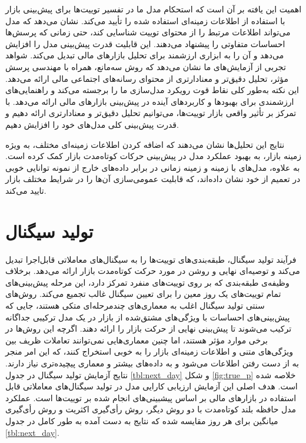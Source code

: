 اهمیت این یافته بر آن است که استحکام مدل ما در تفسیر توییت‌ها برای پیش‌بینی بازار با استفاده‌ از اطلاعات زمینه‌ای استفاده شده را تأیید می‌کند. نشان می‌دهد که مدل می‌تواند اطلاعات مرتبط را از محتوای توییت شناسایی کند، حتی زمانی که پرسش‌ها احساسات متفاوتی را پیشنهاد می‌دهند. این قابلیت قدرت پیش‌بینی مدل را افزایش می‌دهد و آن را به ابزاری ارزشمند برای تحلیل بازارهای مالی تبدیل می‌کند. شواهد تجربی از آزمایش‌های ما نشان می‌دهد که روش سه‌مانع، همراه با مهندسی پرسش مؤثر، تحلیل دقیق‌تر و معنادارتری از محتوای رسانه‌های اجتماعی مالی ارائه می‌دهد. این نکته به‌طور کلی نقاط قوت رویکرد مدل‌سازی ما را برجسته می‌کند و راهنمایی‌های ارزشمندی برای بهبودها و کاربردهای آینده در پیش‌بینی بازارهای مالی ارائه می‌دهد. با تمرکز بر تأثیر واقعی بازار توییت‌ها، می‌توانیم تحلیل دقیق‌تر و معنادارتری ارائه دهیم و قدرت پیش‌بینی کلی مدل‌های خود را افزایش دهیم.

نتایج این تحلیل‌ها نشان می‌دهند که اضافه کردن اطلاعات زمینه‌‌ای مختلف، به ویژه زمینه بازار، به بهبود عملکرد مدل در پیش‌بینی حرکات کوتاه‌مدت بازار کمک کرده است. به علاوه، مدل‌های با زمینه و زمینه زمانی در برابر داده‌های خارج از نمونه توانایی خوبی در تعمیم از خود نشان داده‌اند، که قابلیت عمومی‌سازی آن‌ها را در شرایط مختلف بازار تایید می‌کند.


\newpage
\section{تولید سیگنال}
فرآیند تولید سیگنال، طبقه‌بندی‌های توییت‌ها را به سیگنال‌های معاملاتی قابل‌اجرا تبدیل می‌کند و توصیه‌ای نهایی و روشن در مورد حرکت کوتاه‌مدت بازار ارائه می‌دهد. برخلاف وظیفه‌ی طبقه‌بندی که بر روی توییت‌های منفرد تمرکز دارد، این مرحله پیش‌بینی‌های تمام توییت‌های یک روز معین را برای تعیین سیگنال غالب تجمیع می‌کند. روش‌های سنتی تولید سیگنال اغلب به معماری‌های چندمرحله‌ای متکی هستند، جایی که پیش‌بینی‌های احساسات با ویژگی‌های مشتق‌شده از بازار در یک مدل ترکیبی جداگانه ترکیب می‌شوند تا پیش‌بینی نهایی از حرکت بازار را ارائه دهند. اگرچه این روش‌ها در برخی موارد مؤثر هستند، اما چنین معماری‌هایی نمی‌توانند تعاملات ظریف بین ویژگی‌های متنی و اطلاعات زمینه‌ای بازار را به‌ خوبی استخراج کنند، که این امر منجر به از دست رفتن اطلاعات می‌شود و به داده‌های بیشتر و معماری پیچیده‌تری نیاز دارند. نتایج آزمایش تولید سیگنال در جدول \ref{tbl:next_day} و شکل \ref{fig:true_p} خلاصه شده است. هدف اصلی این آزمایش ارزیابی کارایی مدل در تولید سیگنال‌های معاملاتی قابل استفاده در بازار‌های مالی بر اساس پیشبینی‌های انجام شده بر توییت‌ها است. عملکرد مدل حافظه بلند کوتاه‌مدت با دو روش دیگر، روش رأی‌گیری اکثریت و روش رأی‌گیری میانگین برای هر روز مقایسه شده که نتایج به دست آمده به طور کامل در جدول \ref{tbl:next_day}.

